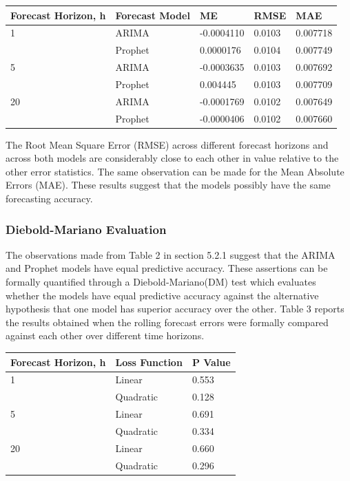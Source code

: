 \documentclass[12pt,a4paper]{article}
\numberwithin{equation}{section}
\numberwithin{figure}{section}
\numberwithin{table}{section}
\let\origtable\table
\let\endorigtable\endtable
\renewenvironment{table}[1][2] {
    \expandafter\origtable\expandafter[H]
} {
    \endorigtable
}
\begin{document}
\begin{table}[H]
\centering
\begin{tabular}{lllll}
  \hline
Forecast Horizon, h & Forecast Model &  ME  & RMSE & MAE \\ 
  \hline
1 & ARIMA & -0.0004110 & 0.0103 & 0.007718 \\ 
    & Prophet & 0.0000176 & 0.0104 & 0.007749 \\ 
  5 & ARIMA & -0.0003635 & 0.0103 & 0.007692 \\ 
    & Prophet & 0.004445 & 0.0103 & 0.007709 \\ 
  20 & ARIMA & -0.0001769 & 0.0102 & 0.007649 \\ 
    & Prophet & -0.0000406 & 0.0102 & 0.007660 \\ 
   \hline
\end{tabular}
\caption{Forecast error diagnostic statistics over different forecasting horizons} 
\end{table}

The Root Mean Square Error (RMSE) across different forecast horizons and
across both models are considerably close to each other in value
relative to the other error statistics. The same observation can be made
for the Mean Absolute Errors (MAE). These results suggest that the
models possibly have the same forecasting accuracy.

\subsubsection{Diebold-Mariano
Evaluation}\label{diebold-mariano-evaluation-1}

The observations made from Table 2 in section 5.2.1 suggest that the
ARIMA and Prophet models have equal predictive accuracy. These
assertions can be formally quantified through a Diebold-Mariano(DM) test
which evaluates whether the models have equal predictive accuracy
against the alternative hypothesis that one model has superior accuracy
over the other. Table 3 reports the results obtained when the rolling
forecast errors were formally compared against each other over different
time horizons.

\begin{table}[H]
\centering
\begin{tabular}{lll}
  \hline
Forecast Horizon, h & Loss Function & P Value \\ 
  \hline
1 & Linear & 0.553 \\ 
    & Quadratic & 0.128 \\ 
  5 & Linear & 0.691 \\ 
    & Quadratic & 0.334 \\ 
  20 & Linear & 0.660 \\ 
    & Quadratic & 0.296 \\ 
   \hline
\end{tabular}
\caption{Results of the Diebold-Mariano Hypothesis Test for different loss functions} 
\end{table}
\end{document}
